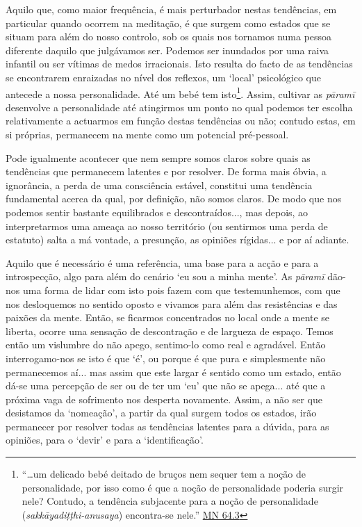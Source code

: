 Aquilo que, como maior frequência, é mais perturbador nestas tendências, em particular quando ocorrem na meditação, é que surgem como estados que se situam para além do nosso controlo, sob os quais nos tornamos numa pessoa diferente daquilo que julgávamos ser. Podemos ser inundados por uma raiva infantil ou ser vítimas de medos irracionais. Isto resulta do facto de as tendências se encontrarem enraizadas no nível dos reflexos, um `local' psicológico que antecede a nossa personalidade. Até um bebé tem isto\footnote{``\ldots um delicado bebé deitado de bruços nem sequer tem a noção de \textquotesingle personalidade\textquotesingle, por isso como é que a noção de personalidade poderia surgir nele? Contudo, a tendência subjacente para a noção de personalidade (\emph{sakkāyadiṭṭhi-anusaya}) encontra-se nele.'' \href{https://suttacentral.net/mn64/en/bodhi}{MN 64.3}}. Assim, cultivar as \emph{pāramī} desenvolve a personalidade até atingirmos um ponto no qual podemos ter escolha relativamente a actuarmos em função destas tendências ou não; contudo estas, em si próprias, permanecem na mente como um potencial pré-pessoal.

Pode igualmente acontecer que nem sempre somos claros sobre quais as tendências que permanecem latentes e por resolver. De forma mais óbvia, a ignorância, a perda de uma consciência estável, constitui uma tendência fundamental acerca da qual, por definição, não somos claros. De modo que nos podemos sentir bastante equilibrados e descontraídos..., mas depois, ao interpretarmos uma ameaça ao nosso território (ou sentirmos uma perda de estatuto) salta a má vontade, a presunção, as opiniões rígidas... e por aí adiante.

Aquilo que é necessário é uma referência, uma base para a acção e para a introspecção, algo para além do cenário `eu sou a minha mente'. As \emph{pāramī} dão-nos uma forma de lidar com isto pois fazem com que testemunhemos, com que nos desloquemos no sentido oposto e vivamos para além das resistências e das paixões da mente. Então, se ficarmos concentrados no local onde a mente se liberta, ocorre uma sensação de descontração e de largueza de espaço. Temos então um vislumbre do não apego, sentimo-lo como real e agradável. Então interrogamo-nos se isto é que `é', ou porque é que pura e simplesmente não permanecemos aí... mas assim que este largar é sentido como um estado, então dá-se uma percepção de ser ou de ter um `eu' que não se apega... até que a próxima vaga de sofrimento nos desperta novamente. Assim, a não ser que desistamos da `nomeação', a partir da qual surgem todos os estados, irão permanecer por resolver todas as tendências latentes para a dúvida, para as opiniões, para o `devir' e para a `identificação'.

